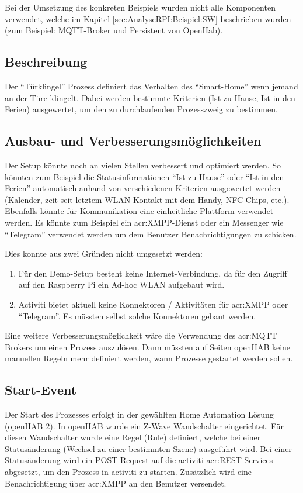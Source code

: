 Bei der Umsetzung des konkreten Beispiels wurden nicht alle Komponenten verwendet, welche im Kapitel \ref{sec:AnalyseRPI:Beispiel:SW}  beschrieben wurden (zum Beispiel: MQTT-Broker und Persistent von OpenHab).

\subsection{Beschreibung}
Der "`Türklingel"' Prozess definiert das Verhalten des "`Smart-Home"' wenn jemand an der Türe klingelt. Dabei werden bestimmte Kriterien (Ist zu Hause, Ist in den Ferien) ausgewertet, um den zu durchlaufenden Prozesszweig zu bestimmen.

\subsection{Ausbau- und Verbesserungsmöglichkeiten}
Der Setup könnte noch an vielen Stellen verbessert und optimiert werden. So könnten zum Beispiel die Statusinformationen "`Ist zu Hause"' oder "`Ist in den Ferien"' automatisch anhand von verschiedenen Kriterien ausgewertet werden (Kalender, zeit seit letztem WLAN Kontakt mit dem Handy, NFC-Chips, etc.). Ebenfalls könnte für Kommunikation eine einheitliche Plattform verwendet werden. Es könnte zum Beispiel ein \gls{acr:XMPP}-Dienst oder ein Messenger wie "`Telegram"' verwendet werden um dem Benutzer Benachrichtigungen zu schicken. 

Dies konnte aus zwei Gründen nicht umgesetzt werden:
\begin{enumerate}
\item Für den Demo-Setup besteht keine Internet-Verbindung, da für den Zugriff auf den Raspberry Pi ein Ad-hoc WLAN aufgebaut wird.
\item Activiti bietet aktuell keine Konnektoren / Aktivitäten für \gls{acr:XMPP} oder "`Telegram"'. Es müssten selbst solche Konnektoren gebaut werden.
\end{enumerate}

Eine weitere Verbesserungsmöglichkeit wäre die Verwendung des \gls{acr:MQTT} Brokers um einen Prozess auszulösen. Dann müssten auf Seiten openHAB keine manuellen Regeln mehr definiert werden, wann Prozesse gestartet werden sollen.

\subsection{Start-Event}
Der Start des Prozesses erfolgt in der gewählten Home Automation Lösung (openHAB 2). In openHAB wurde ein Z-Wave Wandschalter eingerichtet. Für diesen Wandschalter wurde eine Regel (Rule) definiert, welche bei einer Statusänderung (Wechsel zu einer bestimmten Szene) ausgeführt wird. Bei einer Statusänderung wird ein POST-Request auf die activiti \gls{acr:REST} Services abgesetzt, um den Prozess in activiti zu starten. Zusätzlich wird eine Benachrichtigung über \gls{acr:XMPP} an den Benutzer versendet.


